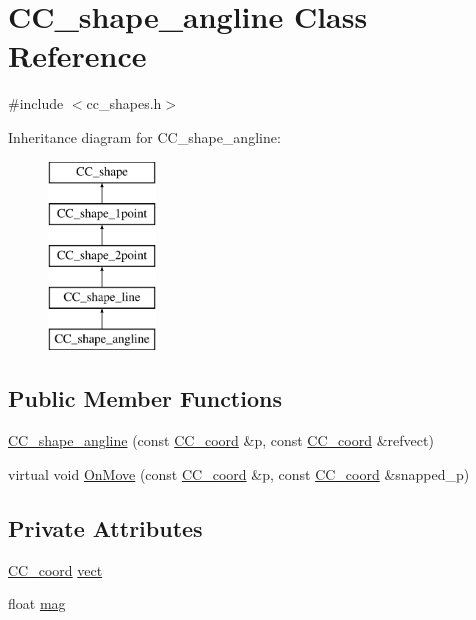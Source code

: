 \hypertarget{a00040}{\section{C\-C\-\_\-shape\-\_\-angline Class Reference}
\label{a00040}
}


{\ttfamily \#include $<$cc\-\_\-shapes.\-h$>$}

Inheritance diagram for C\-C\-\_\-shape\-\_\-angline\-:\begin{figure}[H]
\begin{center}
\leavevmode
\includegraphics[height=5.000000cm]{a00040}
\end{center}
\end{figure}
\subsection*{Public Member Functions}
\begin{DoxyCompactItemize}
\item 
\hyperlink{a00040_a474bdcd7412ddbfa98c8d183e895a10d}{C\-C\-\_\-shape\-\_\-angline} (const \hyperlink{a00029}{C\-C\-\_\-coord} \&p, const \hyperlink{a00029}{C\-C\-\_\-coord} \&refvect)
\item 
virtual void \hyperlink{a00040_a3aead16af5b691651d76d1d71138aae8}{On\-Move} (const \hyperlink{a00029}{C\-C\-\_\-coord} \&p, const \hyperlink{a00029}{C\-C\-\_\-coord} \&snapped\-\_\-p)
\end{DoxyCompactItemize}
\subsection*{Private Attributes}
\begin{DoxyCompactItemize}
\item 
\hyperlink{a00029}{C\-C\-\_\-coord} \hyperlink{a00040_a19ab5a832d2fba6bbef2c0767da54f6c}{vect}
\item 
float \hyperlink{a00040_af6204d4bf9aadab09dc36e8a7f7c9bf2}{mag}
\end{DoxyCompactItemize}
